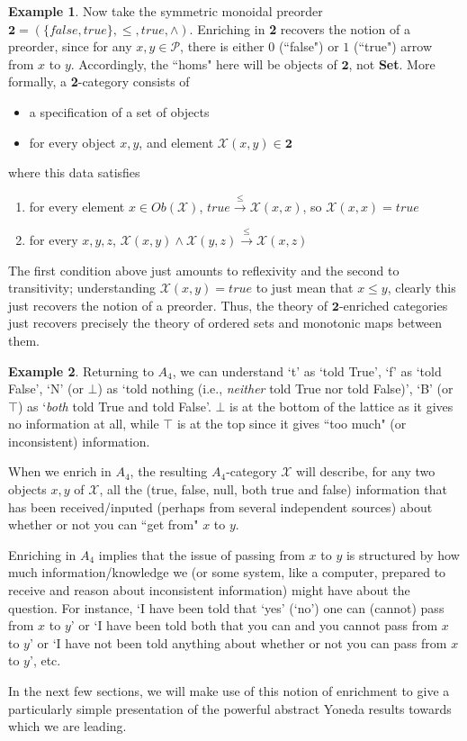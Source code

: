 \documentclass[11pt]{book}
\theoremstyle{definition}
\newtheorem{example}{Example}[section]
\theoremstyle{definition}
\theoremstyle{definition}
\theoremstyle{theorem}
\theoremstyle{definition}
\begin{document}
\begin{example}
	Now take the symmetric monoidal preorder $\textbf{2} = (\{false, true\}, \leq, true, \wedge)$. Enriching in \textbf{2} recovers the notion of a preorder, since for any $x,y \in \mathcal{P}$, there is either $0$ (``false") or $1$ (``true") arrow from $x$ to $y$. Accordingly, the ``homs" here will be objects of $\textbf{2}$, not \textbf{Set}. More formally, a \textbf{2}-category consists of 
	\begin{itemize}
		\item a specification of a set of objects
		\item for every object $x, y$, and element $\mathcal{X}(x,y) \in \textbf{2}$
	\end{itemize} 
	where this data satisfies 
	\begin{enumerate} 
		\item for every element $x \in Ob(\mathcal{X})$, $true \xrightarrow{\leq} \mathcal{X}(x,x)$, so $\mathcal{X}(x,x) = true$
		\item for every $x,y,z$, $\mathcal{X}(x,y) \wedge \mathcal{X}(y,z) \xrightarrow{\leq} \mathcal{X}(x,z)$ 
	\end{enumerate}
	The first condition above just amounts to reflexivity and the second to transitivity; understanding $\mathcal{X}(x,y) = true$ to just mean that $x \leq y$, clearly this just recovers the notion of a preorder. Thus, the theory of $\textbf{2}$-enriched categories just recovers precisely the theory of ordered sets and monotonic maps between them.
\end{example}
\begin{example}
	Returning to $A_4$, we can understand `t' as `told True', `f' as `told False', `N' (or $\bot$) as `told nothing (i.e., \textit{neither} told True nor told False)', `B' (or $\top$) as `\textit{both} told True and told False'. $\bot$ is at the bottom of the lattice as it gives no information at all, while $\top$ is at the top since it gives ``too much" (or inconsistent) information. \par 
	When we enrich in $A_4$, the resulting $A_4$-category $\mathcal{X}$ will describe, for any two objects $x,y$ of $\mathcal{X}$, all the (true, false, null, both true and false) information that has been received/inputed (perhaps from several independent sources) about whether or not you can ``get from" $x$ to $y$. \par 
	Enriching in $A_4$ implies that the issue of passing from $x$ to $y$ is structured by how much information/knowledge we (or some system, like a computer, prepared to receive and reason about inconsistent information) might have about the question. For instance, `I have been told that `yes' (`no') one can (cannot) pass from $x$ to $y$' or `I have been told both that you can and you cannot pass from $x$ to $y$' or `I have not been told anything about whether or not you can pass from $x$ to $y$', etc. 
\end{example}
In the next few sections, we will make use of this notion of enrichment to give a particularly simple presentation of the powerful abstract Yoneda results towards which we are leading.
\end{document}
